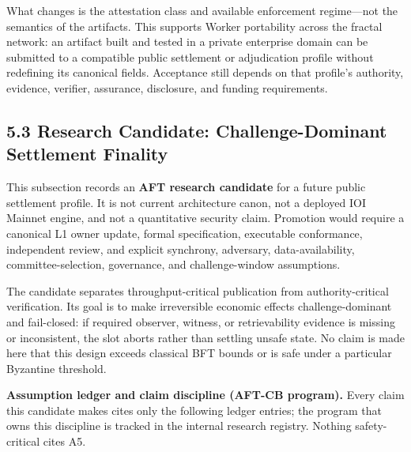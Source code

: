 \documentclass[
  11pt,
]{article}
\begin{document}
What changes is the attestation class and available enforcement regime---not
the semantics of the artifacts. This supports Worker portability across the
fractal network: an artifact built and tested in a private enterprise domain
can be submitted to a compatible public settlement or adjudication profile
without redefining its canonical fields. Acceptance still depends on that
profile's authority, evidence, verifier, assurance, disclosure, and funding
requirements.

\hypertarget{aft-challenge-dominant-settlement-finality}{%
\subsection{5.3 Research Candidate: Challenge-Dominant Settlement
Finality}\label{aft-challenge-dominant-settlement-finality}}

This subsection records an \textbf{AFT research candidate} for a future
public settlement profile. It is not current architecture canon, not a
deployed IOI Mainnet engine, and not a quantitative security claim. Promotion
would require a canonical L1 owner update, formal specification, executable
conformance, independent review, and explicit synchrony, adversary,
data-availability, committee-selection, governance, and challenge-window
assumptions.

The candidate separates
throughput-critical publication from authority-critical verification.
Its goal is to make irreversible economic effects challenge-dominant and
fail-closed: if required observer, witness, or retrievability evidence
is missing or inconsistent, the slot aborts rather than settling unsafe
state. No claim is made here that this design exceeds classical BFT bounds
or is safe under a particular Byzantine threshold.

\textbf{Assumption ledger and claim discipline (AFT-CB program).} Every
claim this candidate makes cites only the following ledger entries; the
program that owns this discipline is tracked in the internal research
registry. Nothing safety-critical cites A5.
\end{document}
